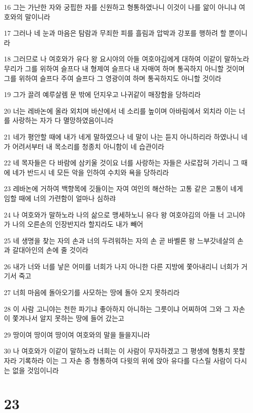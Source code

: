 \par 16 그는 가난한 자와 궁핍한 자를 신원하고 형통하였나니 이것이 나를 앎이 아니냐 여호와의 말이니라
\par 17 그러나 네 눈과 마음은 탐람과 무죄한 피를 흘림과 압박과 강포를 행하려 할 뿐이니라
\par 18 그러므로 나 여호와가 유다 왕 요시야의 아들 여호야김에게 대하여 이같이 말하노라 무리가 그를 위하여 슬프다 내 형제여 슬프다 내 자매여 하며 통곡하지 아니할 것이며 그를 위하여 슬프다 주여 슬프다 그 영광이여 하며 통곡하지도 아니할 것이라
\par 19 그가 끌려 예루살렘 문 밖에 던지우고 나귀같이 매장함을 당하리라
\par 20 너는 레바논에 올라 외치며 바산에서 네 소리를 높이며 아바림에서 외치라 이는 너를 사랑하는 자가 다 멸망하였음이니라
\par 21 네가 평안할 때에 내가 네게 말하였으나 네 말이 나는 듣지 아니하리라 하였나니 네가 어려서부터 내 목소리를 청종치 아니함이 네 습관이라
\par 22 네 목자들은 다 바람에 삼키울 것이요 너를 사랑하는 자들은 사로잡혀 가리니 그 때에 네가 반드시 네 모든 악을 인하여 수치와 욕을 당하리라
\par 23 레바논에 거하여 백향목에 깃들이는 자여 여인의 해산하는 고통 같은 고통이 네게 임할 때에 너의 가련함이 얼마나 심하랴
\par 24 나 여호와가 말하노라 나의 삶으로 맹세하노니 유다 왕 여호야김의 아들 너 고니야가 나의 오른손의 인장반지라 할지라도 내가 빼어
\par 25 네 생명을 찾는 자의 손과 너의 두려워하는 자의 손 곧 바벨론 왕 느부갓네살의 손과 갈대아인의 손에 줄 것이라
\par 26 내가 너와 너를 낳은 어미를 너희가 나지 아니한 다른 지방에 쫓아내리니 너희가 거기서 죽고
\par 27 너희 마음에 돌아오기를 사모하는 땅에 돌아 오지 못하리라
\par 28 이 사람 고니야는 천한 파기냐 좋아하지 아니하는 그릇이냐 어찌하여 그와 그 자손이 쫓겨나서 알지 못하는 땅에 들어 갔는고
\par 29 땅이여 땅이여 땅이여 여호와의 말을 들을지니라
\par 30 나 여호와가 이같이 말하노라 너희는 이 사람이 무자하겠고 그 평생에 형통치 못할 자라 기록하라 이는 그 자손 중 형통하여 다윗의 위에 앉아 유다를 다스릴 사람이 다시는 없을 것임이니라

\chapter{23}

